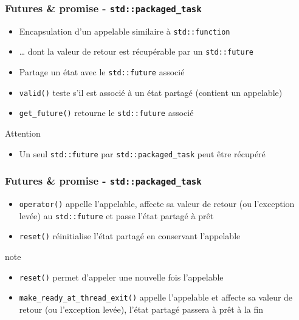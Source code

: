 \documentclass[C++.tex]{subfiles}
\begin{document}
\begin{frame}[fragile]
	\frametitle{Futures \& promise - \lstinline|std::packaged_task|}
	\begin{itemize}
		\item Encapsulation d'un appelable similaire à \lstinline|std::function|
		\item \ldots{} dont la valeur de retour est récupérable par un \lstinline|std::future|
		\item Partage un état avec le \lstinline|std::future| associé
		\item \lstinline|valid()| teste s'il est associé à un état partagé (contient un appelable)
		\item \lstinline|get_future()| retourne le \lstinline|std::future| associé
	\end{itemize}

	\begin{alertblock}{Attention}
		\begin{itemize}
			\item Un seul \lstinline|std::future| par \lstinline|std::packaged_task| peut être récupéré
		\end{itemize}
	\end{alertblock}
\end{frame}

\begin{frame}[fragile]
	\frametitle{Futures \& promise - \lstinline|std::packaged_task|}
	\begin{itemize}
		\item \lstinline|operator()| appelle l'appelable, affecte sa valeur de retour (ou l'exception levée) au \lstinline|std::future| et passe l'état partagé à prêt
		\item \lstinline|reset()| réinitialise l'état partagé en conservant l'appelable
	\end{itemize}

	\begin{block}{note}
		\begin{itemize}
			\item \lstinline|reset()| permet d'appeler une nouvelle fois l'appelable
		\end{itemize}
	\end{block}

	\begin{itemize}
		\item \lstinline|make_ready_at_thread_exit()| appelle l'appelable et affecte sa valeur de retour (ou l'exception levée), l'état partagé passera à prêt à la fin
	\end{itemize}
\end{frame}
\end{document}
